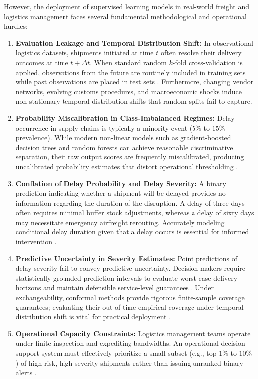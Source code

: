 \documentclass[11pt,a4paper]{article}
\begin{document}
However, the deployment of supervised learning models in real-world freight and logistics management faces several fundamental methodological and operational hurdles:
\begin{enumerate}
    \item \textbf{Evaluation Leakage and Temporal Distribution Shift:} In observational logistics datasets, shipments initiated at time $t$ often resolve their delivery outcomes at time $t + \Delta t$. When standard random $k$-fold cross-validation is applied, observations from the future are routinely included in training sets while past observations are placed in test sets \cite{kapoor2023leakage, roberts2017crossvalidation}. Furthermore, changing vendor networks, evolving customs procedures, and macroeconomic shocks induce non-stationary temporal distribution shifts that random splits fail to capture.
    \item \textbf{Probability Miscalibration in Class-Imbalanced Regimes:} Delay occurrence in supply chains is typically a minority event ($5\%$ to $15\%$ prevalence). While modern non-linear models such as gradient-boosted decision trees and random forests can achieve reasonable discriminative separation, their raw output scores are frequently miscalibrated, producing uncalibrated probability estimates that distort operational thresholding \cite{platt1999probabilistic, niculescu2005predicting, guo2017calibration}.
    \item \textbf{Conflation of Delay Probability and Delay Severity:} A binary prediction indicating whether a shipment will be delayed provides no information regarding the duration of the disruption. A delay of three days often requires minimal buffer stock adjustments, whereas a delay of sixty days may necessitate emergency airfreight rerouting. Accurately modeling conditional delay duration given that a delay occurs is essential for informed intervention \cite{koenker1978regression, kurentzes2020optimising}.
    \item \textbf{Predictive Uncertainty in Severity Estimates:} Point predictions of delay severity fail to convey predictive uncertainty. Decision-makers require statistically grounded prediction intervals to evaluate worst-case delivery horizons and maintain defensible service-level guarantees \cite{romano2019cqr, angelopoulos2023gentle}. Under exchangeability, conformal methods provide rigorous finite-sample coverage guarantees; evaluating their out-of-time empirical coverage under temporal distribution shift is vital for practical deployment \cite{barber2023beyond, gibbs2021adaptive}.
    \item \textbf{Operational Capacity Constraints:} Logistics management teams operate under finite inspection and expediting bandwidths. An operational decision support system must effectively prioritize a small subset (e.g., top $1\%$ to $10\%$) of high-risk, high-severity shipments rather than issuing unranked binary alerts \cite{bastani2021efficient, bertsimas2020predictive}.
\end{enumerate}
\end{document}

